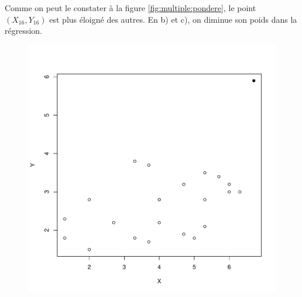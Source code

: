 \begin{solution}{3.17}
    Comme on peut le constater à la figure \ref{fig:multiple:pondere},
    le point $(X_{16}, Y_{16})$ est plus éloigné des autres. En b) et
    c), on diminue son poids dans la régression.
    \begin{figure}
      \centering
\begin{knitrout}
\color{fgcolor}\begin{kframe}
\begin{alltt}
 \hlopt{~}   
\hlopt{$}\hlstd{X[}\hlstd{], donnees}\hlopt{$}\hlstd{Y[}\hlstd{],}  \hlstd{=} \hlstd{)}
\end{alltt}
\end{kframe}
\includegraphics[width=\maxwidth]{figure/unnamed-chunk-56-1}


\end{knitrout}
\end{figure}
\end{solution}
